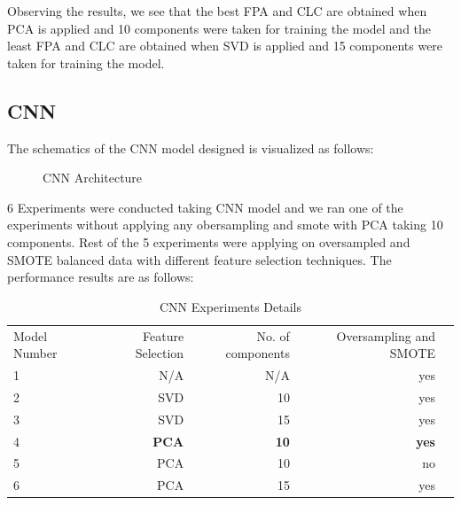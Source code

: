 Observing the results, we see that the best FPA and CLC are obtained when PCA is applied and 10 components were taken for training the model and the least FPA and CLC are obtained when SVD is applied and 15 components were taken for training the model.

\subsection{CNN}
The schematics of the CNN model designed is visualized as follows:

\begin{figure}
%
  \caption{CNN Architecture}
  \label{fig:key}
\end{figure}

6 Experiments were conducted taking CNN model and we ran one of the experiments without applying any obersampling and smote with PCA taking 10 components. Rest of the 5 experiments were applying on oversampled and SMOTE balanced data with different feature selection techniques. The performance results are as follows:
 
\begin{table}[!htp]\centering
\caption{CNN Experiments Details}\label{tab: }
\scriptsize
\begin{tabular}{lrrrr}\toprule
Model Number &Feature Selection &No. of components &Oversampling and SMOTE \\
1 &N/A &N/A &yes \\\midrule
2 &SVD &10 &yes \\
3 &SVD &15 &yes \\
4 &\textbf{PCA} &\textbf{10} &\textbf{yes} \\
5 &PCA &10 &no \\
6 &PCA &15 &yes \\
\bottomrule
\end{tabular}
\end{table}

